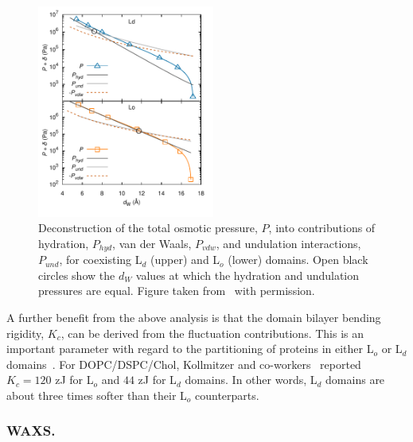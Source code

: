 \documentclass[8.5pt,twoside,twocolumn]{article}
\begin{document}
\begin{figure}
	\centering
	\includegraphics[height=7cm]{figures/forces.pdf}
	\caption{Deconstruction of the total osmotic pressure, $P$, into contributions of hydration, $P_{hyd}$, van der Waals, $P_{vdw}$, and undulation interactions, $P_{und}$, for coexisting L$_d$ (upper) and L$_o$ (lower) domains. Open black circles show the $d_W$ values at which the hydration and undulation pressures are equal. Figure taken from~\cite{Kollmitzer.2015} with permission.}
	\label{fig:forces}
\end{figure}

A further benefit from the above analysis is that the domain bilayer bending rigidity, $K_c$, can be derived from the fluctuation contributions. This is an important parameter with regard to the partitioning of proteins in either L$_o$ or L$_d$ domains~\cite{Marsh.2007,Marsh.2008}. For DOPC/DSPC/Chol, Kollmitzer and co-workers~\cite{Kollmitzer.2015} reported $K_c = 120$ zJ for L$_o$ and $44$ zJ for L$_d$ domains. In other words, L$_d$ domains are about three times softer than their L$_o$ counterparts.


\subsubsection{WAXS. }
\end{document}
